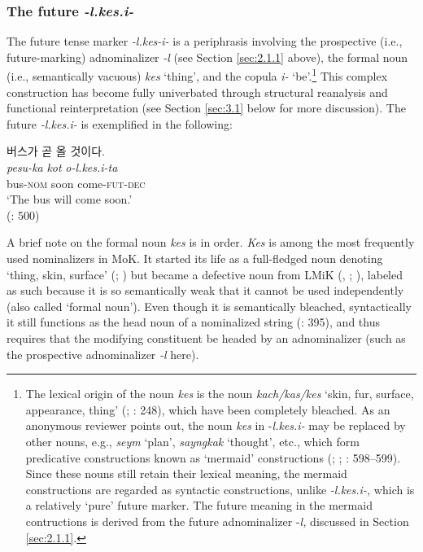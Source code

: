 \documentclass[output=paper,colorlinks,citecolor=brown]{langscibook}
\begin{document}
\subsubsection{The future \textit{-l.kes.i-}}
The future tense marker \textit{-l.kes-i- }is a periphrasis involving the prospective (i.e., future-marking) adnominalizer \textit{-l} (see Section \ref{sec:2.1.1} above), the formal noun (i.e., semantically vacuous) \textit{kes} ‘thing’, and the copula \textit{i- }‘be’.\footnote{The lexical origin of the noun \textit{kes} is the noun \textit{kach/kas/kes} ‘skin, fur, surface, appearance, thing’ (\cite{Hong1983}; \cite{Rhee2008}: 248), which have been completely bleached. As an anonymous reviewer points out, the noun \textit{kes} in -\textit{l.kes.i-} may be replaced by other nouns, e.g., \textit{seym} ‘plan’, \textit{sayngkak} ‘thought’, etc., which form predicative constructions known as ‘mermaid’ constructions (\cite{Tsunoda2013}; \cite{Kim2013}; \cite{Rhee2020}: 598--599). Since these nouns still retain their lexical meaning, the mermaid constructions are regarded as syntactic constructions, unlike \textit{-l.kes.i-,} which is a relatively ‘pure’ future marker. The future meaning in the mermaid contructions is derived from the future adnominalizer -\textit{l,} discussed in Section \ref{sec:2.1.1}.} This complex construction has become fully univerbated through structural reanalysis and functional reinterpretation (see Section \ref{sec:3.1} below for more discussion). The future \textit{-l.kes.i-} is exemplified in the following: 

\ea
    \ea \textkorean{버스가 곧 올 것이다}.\\
    \gll \textit{pesu-ka} \textit{kot} \textit{o-l.kes.i-ta}\\
         bus-\textsc{nom} soon come-\textsc{fut-dec}\\
    \glt ‘The bus will come soon.’ \\
    \hfill (\cite{Lee2010}: 500)
    \z
\z

A brief note on the formal noun \textit{kes} is in order. \textit{Kes} is among the most frequently used nominalizers in MoK. It started its life as a full-fledged noun denoting ‘thing, skin, surface’ (\cite{Hong1983}; \cite{Rhee2011}) but became a defective noun from LMiK (\cite{Huh1983}, \cite{Jeong1989}; \cite{Lee1988}), labeled as such because it is so semantically weak that it cannot be used independently (also called ‘formal noun’). Even though it is semantically bleached, syntactically it still functions as the head noun of a nominalized string (\cite{Rhee2011}: 395), and thus requires that the modifying constituent be headed by an adnominalizer (such as the prospective adnominalizer \textit{-l} here). 
\end{document}
